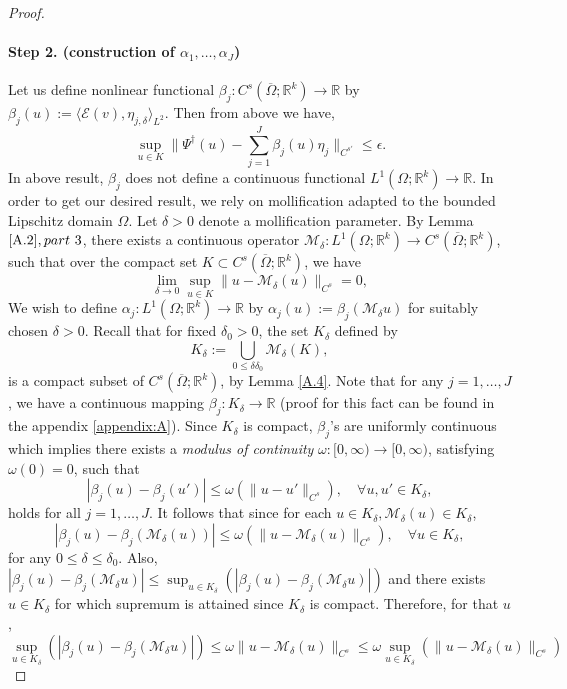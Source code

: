 \documentclass[reqno]{amsart}
\theoremstyle{plain}
\theoremstyle{definition}
\newcommand{\bb}[1]{\mathbb{#1}}
\newcommand{\cal}[1]{\mathcal{#1}}
\begin{document}
\begin{proof}
    \paragraph{\bf Step 2. (construction of $\alpha_1, \dots, \alpha_J$)}
    Let us define nonlinear functional $\beta_j: C^s(\overline{\Omega};\bb R^k) \to \bb R$ by  $\beta_j(u) := \langle \cal E (v),\eta_{j,\delta} \rangle_{L^2}$. Then from above we have,
    \begin{equation} \label{4}
        \sup\limits_{u \in K}\|\Psi^\dag(u) - \sum_{j=1}^{J}\beta_j(u)\eta_j\|_{C^{s'}} \leq \epsilon.
    \end{equation}
    In above result, $\beta_j$ does not define a continuous functional $L^1(\Omega;\bb R^k) \to \bb R$. In order to get our desired result, we rely on mollification adapted to the bounded Lipschitz domain $\Omega$. Let $\delta > 0$ denote a mollification parameter. By Lemma $\ref{A.2}, part ~3$, there exists a continuous operator $\cal M_\delta : L^1(\Omega;\bb R^k) \to C^s(\overline{\Omega};\bb R^k)$, such that over the compact set $K \subset C^s(\overline{\Omega};\bb R^k)$, we have 
    $$ \lim_{\delta \to 0}\sup\limits_{u \in K}\|u - \cal M_\delta (u)\|_{C^s} = 0,$$
    We wish to define $\alpha_j : L^1(\Omega;\bb R^k) \to \bb R$ by $\alpha_j(u):= \beta_j(\cal M_\delta u)$ for suitably chosen $\delta > 0$. Recall that for fixed $\delta_0 > 0$, the set $K_\delta$ defined by 
    $$ K_\delta := \bigcup\limits_{0\leq\delta\delta_0} \cal M_\delta (K),$$
    is a compact subset of $C^s(\overline{\Omega};\bb R^k)$, by Lemma \ref{A.4}. Note that for any $j = 1, \dots, J$, we have a continuous mapping $\beta_j : K_\delta \to \bb R$ (proof for this fact can be found in the appendix \ref{appendix:A}). Since $K_\delta$ is compact, $\beta_j$'s are uniformly continuous which implies there exists a {\it modulus of continuity} $\omega : [0,\infty) \to [0, \infty)$, satisfying $\omega(0) = 0$, such that
    $$ |\beta_j(u) - \beta_j(u')| \leq \omega(\|u - u'\|_{C^s}), \quad \forall u,u' \in K_\delta,$$
    holds for all $j = 1, \dots, J$. It follows that since for each $u\in K_\delta, \cal M_\delta(u) \in K_\delta$,
    $$|\beta_j(u) - \beta_j(\cal M_\delta(u))| \leq \omega(\|u - \cal M_\delta(u)\|_{C^s}), \quad \forall u \in K_\delta,$$
    for any $0 \leq \delta \leq \delta_0$. Also, $|\beta_j(u) - \beta_j(\cal M_\delta u)| \leq \sup_{u \in K_\delta}(|\beta_j(u) - \beta_j(\cal M_\delta u)|)$ and there exists $u \in K_\delta$ for which supremum is attained since $K_\delta$ is compact. Therefore, for that $u$,
    $$ \sup\limits_{u \in K_\delta}(|\beta_j(u) - \beta_j(\cal M_\delta u)|)\leq \omega \|u - \cal M_\delta (u)\|_{C^s} \leq \omega \sup\limits_{u \in K_\delta} \left(\|u - \cal M_\delta (u)\|_{C^s}\right)$$

\end{proof}
\end{document}
